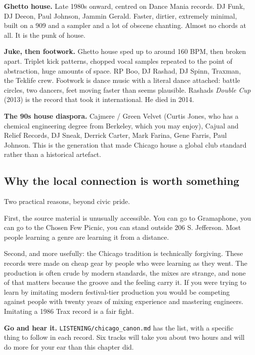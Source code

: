 \textbf{Ghetto house.} Late 1980s onward, centred on Dance Mania records. DJ Funk, DJ Deeon,
Paul Johnson, Jammin Gerald. Faster, dirtier, extremely minimal, built on a 909 and a
sampler and a lot of obscene chanting. Almost no chords at all. It is the punk of house.

\textbf{Juke, then footwork.} Ghetto house sped up to around 160 BPM, then broken apart. Triplet
kick patterns, chopped vocal samples repeated to the point of abstraction, huge amounts of
space. RP Boo, DJ Rashad, DJ Spinn, Traxman, the Teklife crew. Footwork is dance music with
a literal dance attached: battle circles, two dancers, feet moving faster than seems
plausible. Rashad\textquotesingle s \emph{Double Cup} (2013) is the record that took it international. He died in
2014.

\textbf{The 90s house diaspora.} Cajmere / Green Velvet (Curtis Jones, who has a chemical
engineering degree from Berkeley, which you may enjoy), Cajual and Relief Records, DJ
Sneak, Derrick Carter, Mark Farina, Gene Farris, Paul Johnson. This is the generation that
made Chicago house a global club standard rather than a historical artefact.

\subsection{Why the local connection is worth something}\label{th02_chicago-why-the-local-connection-is-worth-something}

Two practical reasons, beyond civic pride.

First, the source material is unusually accessible. You can go to Gramaphone, you can go to
the Chosen Few Picnic, you can stand outside 206 S. Jefferson. Most people learning a genre
are learning it from a distance.

Second, and more usefully: the Chicago tradition is technically forgiving. These records
were made on cheap gear by people who were learning as they went. The production is often
crude by modern standards, the mixes are strange, and none of that matters because the
groove and the feeling carry it. If you were trying to learn by imitating modern
festival-tier production you would be competing against people with twenty years of mixing
experience and mastering engineers. Imitating a 1986 Trax record is a fair fight.

\begin{listenbox}
\textbf{Go and hear it.} \texttt{LISTENING/chicago\_canon.md} has the list, with a specific thing to
follow in each record. Six tracks will take you about two hours and will do more for your
ear than this chapter did.
\end{listenbox}
